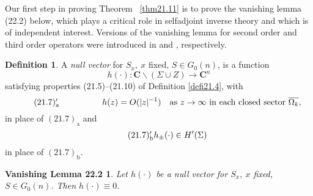 \documentclass{surv-l}
\theoremstyle{plain}
\newtheorem*{vl}{Vanishing Lemma 22.2}
\theoremstyle{definition}
\newtheorem{definition}[theorem]{Definition}
\numberwithin{equation}{chapter}
\begin{document}
Our first step in proving Theorem ~\ref{thm21.11} is to prove the vanishing lemma (22.2)  below, which plays a critical role in selfadjoint inverse theory and which is of independent interest. Versions of the vanishing lemma for second order and third order operators were introduced in \cite{DT} and \cite{DTT}, respectively.
\setcounter{theorem}{0}
\begin{definition}\label{defi22.1}
A \emph{null vector}  for $S_{x},\ x$ fixed, $S\in G_{0}(n)$, is a function
\begin{equation*}
h(\cdot):\mathbf{C}\backslash (\Sigma\cup Z)\rightarrow \mathbf{C}^{n}
\end{equation*}
satisfying properties (21.5)--(21.10) of Definition \ref{defi21.4}, with
\begin{equation*}
\tag*{$(21.7)_{\mathrm{a}}^{\prime}$} \qquad \qquad \quad h(z)=O(|z|^{-1})\quad \mathrm{as}\  z\rightarrow\infty\ \text{in each closed sector}\ \overline{\Omega_{k}},
\end{equation*}
in place of $(21.7)_{\mathrm{a}}$ and
\begin{equation*}
\tag*{$(21.7)_{\mathrm{b}}^{\prime}$} h_{\pm}(\cdot)\in H'(\Sigma)
\end{equation*}
in place of $(21.7)_{\mathrm{b}}$.
\end{definition}

\begin{vl}\label{lem22.2}
Let $h(\cdot)$ be a null vector for $S_{x},\ x$ fixed, $S\in G_{0}(n)$. Then $h(\cdot)\equiv 0$.
\end{vl}
\end{document}
